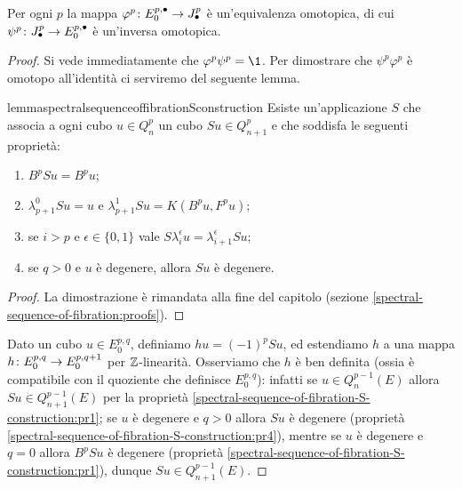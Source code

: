 \begin{proposition}
Per ogni $p$ la mappa $\varphi^p\colon E^{p,\bullet}_0\to J^p_\bullet$ è un'equivalenza omotopica, di cui $\psi^p\colon J^p_\bullet\to E^{p,\bullet}_0$ è un'inversa omotopica.
\end{proposition}
\begin{proof}
Si vede immediatamente che $\varphi^p\psi^p=\1$. Per dimostrare che $\psi^p\varphi^p$ è omotopo all'identità ci serviremo del seguente lemma.
\begin{restatable}{lemma}{spectralsequenceoffibrationSconstruction}
Esiste un'applicazione $S$ che associa a ogni cubo $u\in Q^p_n$ un cubo $Su\in Q^p_{n+1}$ e che soddisfa le seguenti proprietà:
\begin{enumerate}
\item\label{spectral-sequence-of-fibration-S-construction:pr1} $B^pSu=B^pu$;
\item\label{spectral-sequence-of-fibration-S-construction:pr2} $\lambda^0_{p+1}Su=u$ e $\lambda^1_{p+1}Su=K(B^pu,F^pu)$;
\item\label{spectral-sequence-of-fibration-S-construction:pr3} se $i>p$ e $\epsilon\in\{0,1\}$ vale $S\lambda^\epsilon_iu=\lambda^\epsilon_{i+1}Su$;
\item\label{spectral-sequence-of-fibration-S-construction:pr4} se $q>0$ e $u$ è degenere, allora $Su$ è degenere.
\end{enumerate}
\end{restatable}
\begin{proof}
La dimostrazione è rimandata alla fine del capitolo (sezione \ref{spectral-sequence-of-fibration:proofs}).
\end{proof}
Dato un cubo $u\in E^{p,q}_0$, definiamo $hu=(-1)^pSu$, ed estendiamo $h$ a una mappa
$h\colon E^{p,q}_0\to E^{p,q+1}_0$ per $\mathbb{Z}$-linearità. Osserviamo che $h$ è ben definita (ossia è compatibile con il quoziente che definisce $E^{p,q}_0$): infatti se $u\in Q^{p-1}_n(E)$ allora $Su\in Q^{p-1}_{n+1}(E)$ per la proprietà \ref{spectral-sequence-of-fibration-S-construction:pr1}; se $u$ è degenere e $q>0$ allora $Su$ è degenere (proprietà \ref{spectral-sequence-of-fibration-S-construction:pr4}), mentre se $u$ è degenere e $q=0$ allora $B^pSu$ è degenere (proprietà \ref{spectral-sequence-of-fibration-S-construction:pr1}), dunque $Su\in Q^{p-1}_{n+1}(E)$.


\end{proof}
